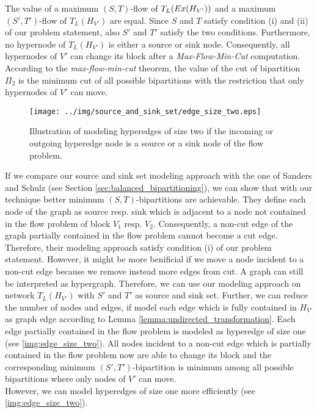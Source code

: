 The value of a maximum $(S,T)$-flow of $T_L(Ex(H_{V'}))$ and a maximum $(S',T')$-flow
of $T_L(H_{V'})$ are equal. Since $S$ and $T$ satisfy condition (i) and (ii) of our 
problem statement, also $S'$ and $T'$ satisfy the two conditions. Furthermore, no hypernode
of $T_L(H_{V'})$ is either a source or sink node. Consequently, all hypernodes of $V'$
can change its block after a \emph{Max-Flow-Min-Cut} computation. According to the 
\emph{max-flow-min-cut} theorem, the value of the cut of bipartition $\Pi_2$ is the minimum
cut of all possible bipartitions with the restriction that only hypernodes of $V'$ can move.\\
\begin{figure}
\centering
\texttt{[image: ../img/source\_and\_sink\_set/edge\_size\_two.eps]}
\caption{Illustration of modeling hyperedges of size two if the incoming or outgoing
         hyperedge node is a source or a sink node of the flow problem.}
\label{img:edge_size_two}
\end{figure}
If we compare our source and sink set modeling approach with the one of Sanders and Schulz
\cite{sanders2011engineering} (see Section \ref{sec:balanced_bipartitioning}), we can show that
with our technique better minimum $(S,T)$-bipartitions are achievable. They define each node of the graph
as source resp. sink which is adjacent to a node not contained in the flow problem of block $V_1$
resp. $V_2$. Consequently, a non-cut edge of the graph partially contained in the flow problem
cannot become a cut edge. Therefore, their modeling approach satisfy condition (i) of our problem
statement. However, it might be more benificial if we move a node incident to a non-cut edge because
we remove instead more edges from cut. A graph can still be interpreted as hypergraph. Therefore,
we can use our modeling approach on network $T_L(H_{V'})$ with $S'$ and $T'$ as source and sink
set. Further, we can reduce the number of nodes and edges, if model each edge which is fully contained
in $H_{V'}$ as graph edge according to Lemma \ref{lemma:undirected_transformation}. Each edge
partially contained in the flow problem is modeled as hyperedge of size one (see \autoref{img:edge_size_two}).
All nodes incident to a non-cut edge which is partially contained in the flow problem
now are able to change its block and the corresponding minimum $(S',T')$-bipartition is minimum
among all possible bipartitions where only nodes of $V'$ can move. \\
However, we can model hyperedges of size one more efficiently (see \autoref{img:edge_size_two}).
